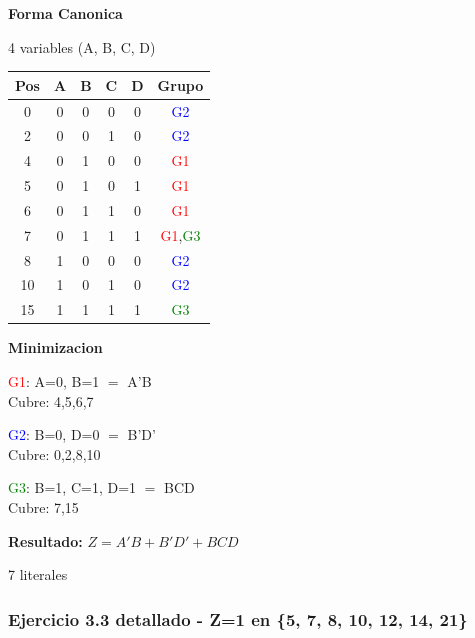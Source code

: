 \documentclass[12pt,a4paper]{article}
\begin{document}
\begin{minipage}[t]{0.58\textwidth}
\textbf{Forma Canonica}

4 variables (A, B, C, D)

\begin{tabular}{|c|c|c|c|c|c|}
\hline
Pos & A & B & C & D & Grupo \\
\hline
0  & 0 & 0 & 0 & 0 & \textcolor{blue}{G2} \\
2  & 0 & 0 & 1 & 0 & \textcolor{blue}{G2} \\
4  & 0 & 1 & 0 & 0 & \textcolor{red}{G1} \\
5  & 0 & 1 & 0 & 1 & \textcolor{red}{G1} \\
6  & 0 & 1 & 1 & 0 & \textcolor{red}{G1} \\
7  & 0 & 1 & 1 & 1 & \textcolor{red}{G1},\textcolor{green}{G3} \\
8  & 1 & 0 & 0 & 0 & \textcolor{blue}{G2} \\
10 & 1 & 0 & 1 & 0 & \textcolor{blue}{G2} \\
15 & 1 & 1 & 1 & 1 & \textcolor{green}{G3} \\
\hline
\end{tabular}
\end{minipage}
\hspace{0.3cm}
\begin{minipage}[t]{0.38\textwidth}
\textbf{Minimizacion}

\vspace{0.2cm}
\textcolor{red}{G1}: A=0, B=1 $=$ A'B \\ Cubre: 4,5,6,7

\vspace{0.2cm}
\textcolor{blue}{G2}: B=0, D=0 $=$ B'D' \\ Cubre: 0,2,8,10

\vspace{0.2cm}
\textcolor{green}{G3}: B=1, C=1, D=1 $=$ BCD \\ Cubre: 7,15

\vspace{0.3cm}
\textbf{Resultado:} $Z = A'B + B'D' + BCD$

7 literales
\end{minipage}

\vspace{0.5cm}

\subsubsection{Ejercicio 3.3 detallado - Z=1 en \{5, 7, 8, 10, 12, 14, 21\}}
\end{document}
